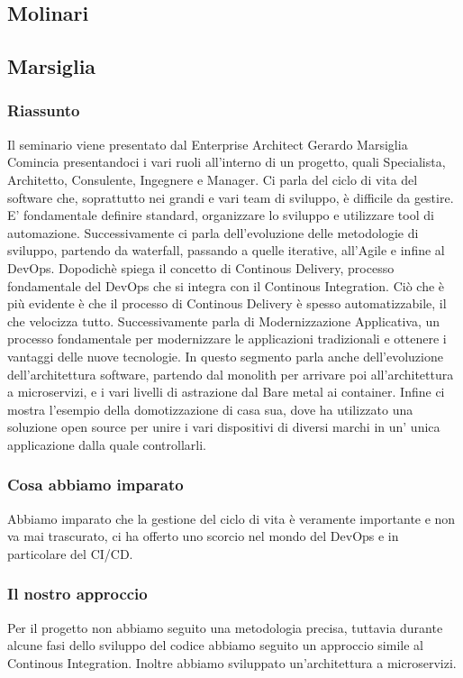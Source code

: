\documentclass{report}
\begin{document}
\subsection{Molinari}

\subsection{Marsiglia}
\subsubsection*{Riassunto}
Il seminario viene presentato dal Enterprise Architect Gerardo Marsiglia
Comincia presentandoci i vari ruoli all'interno di un progetto, quali Specialista, Architetto, Consulente, Ingegnere e Manager.
Ci parla del ciclo di vita del software che, soprattutto nei grandi e vari team di sviluppo, è difficile da gestire. E' fondamentale definire standard, organizzare lo sviluppo e utilizzare tool di automazione.
Successivamente ci parla dell'evoluzione delle metodologie di sviluppo, partendo da waterfall, passando a quelle iterative, all'Agile e infine al DevOps.
Dopodichè spiega il concetto di Continous Delivery, processo fondamentale del DevOps che si integra con il Continous Integration. 
Ciò che è più evidente è che il processo di Continous Delivery è spesso automatizzabile, il che velocizza tutto.
Successivamente parla di Modernizzazione Applicativa, un processo fondamentale per modernizzare le applicazioni tradizionali e ottenere i vantaggi delle nuove tecnologie.
In questo segmento parla anche dell'evoluzione dell'architettura software, partendo dal monolith per arrivare poi all'architettura a microservizi, e i vari livelli di astrazione dal Bare metal ai container.
Infine ci mostra l'esempio della domotizzazione di casa sua, dove ha utilizzato una soluzione open source per unire i vari dispositivi di diversi marchi in un' unica applicazione dalla quale controllarli.

\subsubsection*{Cosa abbiamo imparato}
Abbiamo imparato che la gestione del ciclo di vita è veramente importante e non va mai trascurato, ci ha offerto uno scorcio nel mondo del DevOps e in particolare del CI/CD.
\subsubsection*{Il nostro approccio}
Per il progetto non abbiamo seguito una metodologia precisa, tuttavia durante alcune fasi dello sviluppo del codice abbiamo seguito un approccio simile al Continous Integration.
Inoltre abbiamo sviluppato un'architettura a microservizi.
\end{document}
